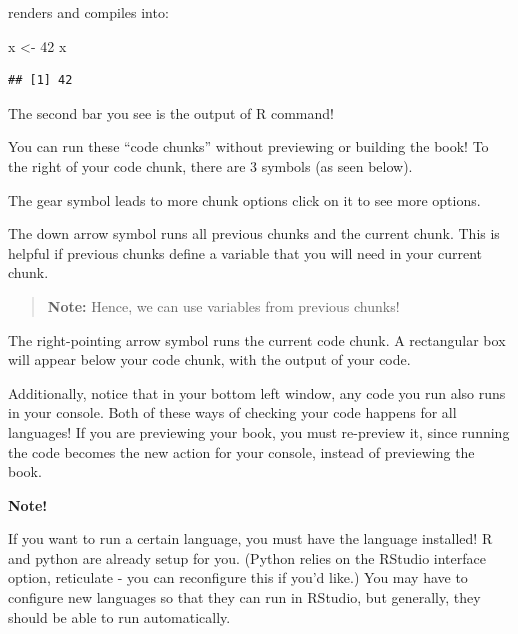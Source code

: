 \documentclass[
]{book}
\newenvironment{Shaded}{\begin{snugshade}}{\end{snugshade}}
\newcommand{\DecValTok}[1]{\textcolor[rgb]{0.00,0.00,0.81}{#1}}
\newcommand{\NormalTok}[1]{#1}
\newcommand{\OtherTok}[1]{\textcolor[rgb]{0.56,0.35,0.01}{#1}}
\newenvironment{redbox}{
  \definecolor{shadecolor}{RGB}{243, 154, 157}
  \color{white}
  \begin{shaded}}
 {\end{shaded}}
\theoremstyle{definition}
\theoremstyle{definition}
\theoremstyle{definition}
\theoremstyle{definition}
\theoremstyle{remark}
\begin{document}
renders and compiles into:

\begin{Shaded}
\begin{Highlighting}[]
\NormalTok{x }\OtherTok{\textless{}{-}} \DecValTok{42}
\NormalTok{x}
\end{Highlighting}
\end{Shaded}

\begin{verbatim}
## [1] 42
\end{verbatim}

The second bar you see is the output of R command!

You can run these ``code chunks'' without previewing or building the book! To the right of your code chunk, there are 3 symbols (as seen below).

The {gear symbol} leads to more chunk options click on it to see more options.

The {down arrow symbol} runs all previous chunks and the current chunk. This is helpful if previous chunks define a variable that you will need in your current chunk.

\begin{quote}
\textbf{Note:} Hence, we can use variables from previous chunks!
\end{quote}

The {right-pointing arrow symbol} runs the current code chunk. A rectangular box will appear below your code chunk, with the output of your code.

Additionally, notice that in your bottom left window, any code you run also runs in your console. Both of these ways of checking your code happens for all languages! If you are previewing your book, you must re-preview it, since running the code becomes the new action for your console, instead of previewing the book.

\begin{redbox}

\begin{center}
\textbf{Note!}

\end{center}

If you want to run a certain language, you must have the language installed! R and python are already setup for you. (Python relies on the RStudio interface option, reticulate - you can reconfigure this if you'd like.) You may have to configure new languages so that they can run in RStudio, but generally, they should be able to run automatically.

\end{redbox}
\end{document}
